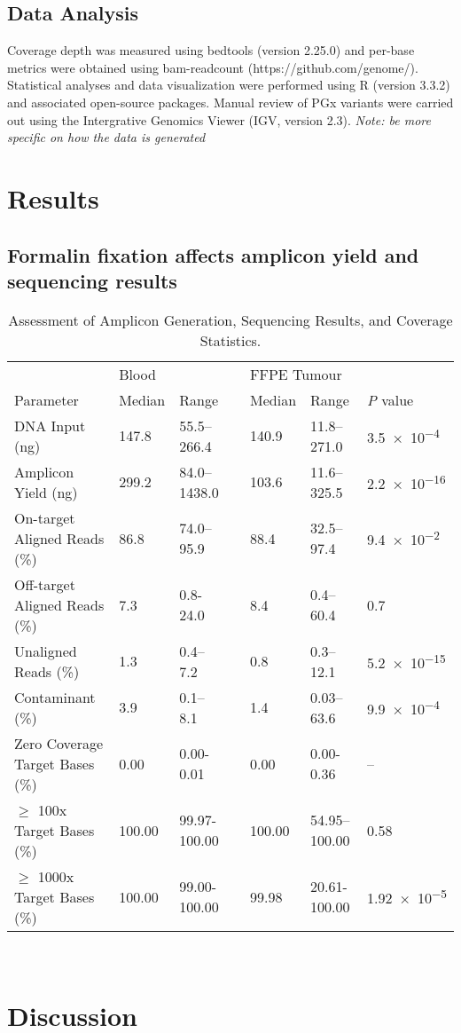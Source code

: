 \subsection{Data Analysis}

Coverage depth was measured using bedtools (version 2.25.0) and per-base metrics were obtained using bam-readcount (https://github.com/genome/). Statistical analyses and data visualization were performed using R (version 3.3.2) and associated open-source packages. Manual review of PGx variants were carried out using the Intergrative Genomics Viewer (IGV, version 2.3). \textit{Note: be more specific on how the data is generated}

\section{Results}
\label{sec:Results}

\subsection{Formalin fixation affects amplicon yield and sequencing results}

\begin{table}[H]
\caption{Assessment of Amplicon Generation, Sequencing Results, and Coverage Statistics.}\label{metrics}
      \begin{tabular}{lllllll}
        \hline
				\multicolumn{1}{l}{ }
				&
				\multicolumn{2}{l}{Blood}
				&&
				\multicolumn{2}{l}{FFPE Tumour}
				&
				\multicolumn{1}{l}{ } \\
				\cline{2-3}\cline{5-6}
        Parameter & Median & Range && Median & Range & \textit{P} value \\ \hline
				DNA Input (ng) & 147.8 & 55.5--266.4 && 140.9 & 11.8--271.0 & \num{3.5e-4} \\
				Amplicon Yield (ng) & 299.2 & 84.0--1438.0 && 103.6 & 11.6--325.5 & \num{2.2e-16} \\
				On-target Aligned Reads (\%) & 86.8 & 74.0--95.9 && 88.4 & 32.5--97.4 & \num{9.4e-2} \\
				Off-target Aligned Reads (\%) & 7.3 & 0.8-24.0 && 8.4 & 0.4--60.4 & \num{0.7} \\
				Unaligned Reads (\%) & 1.3 & 0.4--7.2 && 0.8 & 0.3--12.1 & \num{5.2e-15} \\
				Contaminant (\%) & 3.9 & 0.1--8.1 && 1.4 & 0.03--63.6 &
				\num{9.9e-4} \\
				Zero Coverage Target Bases (\%) & 0.00 & 0.00-0.01 && 0.00 & 0.00-0.36 &
				-- \\
				$\geq$ 100x Target Bases (\%) & 100.00 & 99.97-100.00 && 100.00 & 54.95--100.00 &
				\num{0.58} \\
				$\geq$ 1000x Target Bases (\%) & 100.00 & 99.00-100.00 && 99.98 & 20.61-100.00 & \num{1.92e-5} \\
				\hline
      \end{tabular} \\
\end{table}

\section{Discussion}
\label{sec:Discussion}
